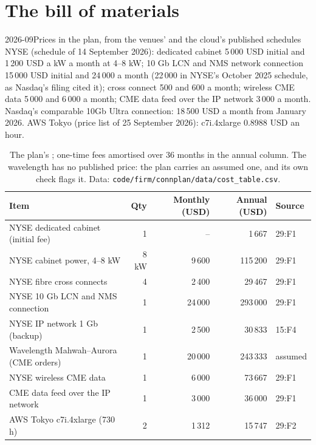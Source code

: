 \section{The bill of materials}

\begin{dated}{2026-09}{Prices in the plan, from the venues' and the cloud's published schedules}\label{dat:nw:build-a-connectivity-plan:prices}
NYSE (schedule of 14 September 2026): dedicated cabinet 5\,000 USD initial and 1\,200 USD a kW a month at 4--8 kW; 10 Gb LCN and NMS
network connection 15\,000 USD initial and 24\,000 a month (22\,000 in NYSE's October 2025 schedule, as Nasdaq's filing cited it); cross
connect 500 and 600 a month; wireless CME data 5\,000 and 6\,000 a month; CME data feed over the IP network 3\,000 a month. Nasdaq's
comparable 10Gb Ultra connection: 18\,500 USD a month from January 2026. AWS Tokyo (price list of 25 September 2026): c7i.4xlarge
0.8988 USD an hour.
\end{dated}

\begin{table}[ht]
\centering\footnotesize
\begin{tabular}{@{}lrrrl@{}}
\toprule
Item & Qty & Monthly (USD) & Annual (USD) & Source \\
\midrule
NYSE dedicated cabinet (initial fee) & 1 & -- & 1\,667 & 29:F1 \\
NYSE cabinet power, 4--8 kW & 8 kW & 9\,600 & 115\,200 & 29:F1 \\
NYSE fibre cross connects & 4 & 2\,400 & 29\,467 & 29:F1 \\
NYSE 10 Gb LCN and NMS connection & 1 & 24\,000 & 293\,000 & 29:F1 \\
NYSE IP network 1 Gb (backup) & 1 & 2\,500 & 30\,833 & 15:F4 \\
Wavelength Mahwah--Aurora (CME orders) & 1 & 20\,000 & 243\,333 & assumed \\
NYSE wireless CME data & 1 & 6\,000 & 73\,667 & 29:F1 \\
CME data feed over the IP network & 1 & 3\,000 & 36\,000 & 29:F1 \\
AWS Tokyo c7i.4xlarge (730 h) & 2 & 1\,312 & 15\,747 & 29:F2 \\
\bottomrule
\end{tabular}
\caption{The plan's ; one-time fees amortised over 36 months in the annual column. The wavelength has no published
price: the plan carries an assumed one, and its own check flags it. Data: \texttt{code/firm/connplan/data/cost\_table.csv}.}\label{tab:nw:build-a-connectivity-plan:bom}
\end{table}

